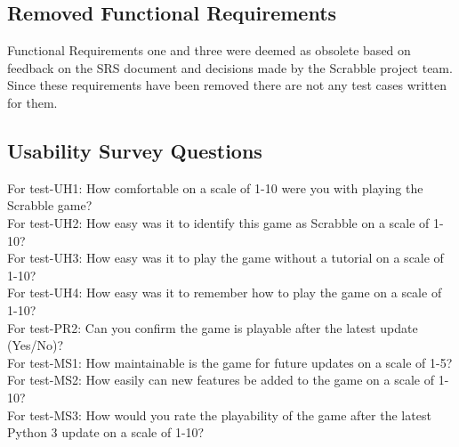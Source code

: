 \documentclass[12pt, titlepage]{article}
\begin{document}
\subsection{Removed Functional Requirements}
Functional Requirements one and three were deemed as obsolete based on feedback on the SRS document and decisions made by the Scrabble project team. Since these requirements have been removed there are not any test cases written for them.\\
\subsection{Usability Survey Questions}
For test-UH1: How comfortable on a scale of 1-10 were you with playing the Scrabble game?\\
For test-UH2: How easy was it to identify this game as Scrabble on a scale of 1-10?\\
For test-UH3: How easy was it to play the game without a tutorial on a scale of 1-10?\\
For test-UH4: How easy was it to remember how to play the game on a scale of 1-10?\\
For test-PR2: Can you confirm the game is playable after the latest update (Yes/No)?\\
For test-MS1: How maintainable is the game for future updates on a scale of 1-5?\\
For test-MS2: How easily can new features be added to the game on a scale of 1-10?\\
For test-MS3: How would you rate the playability of the game after the latest Python 3 update on a scale of 1-10?\\
\end{document}

